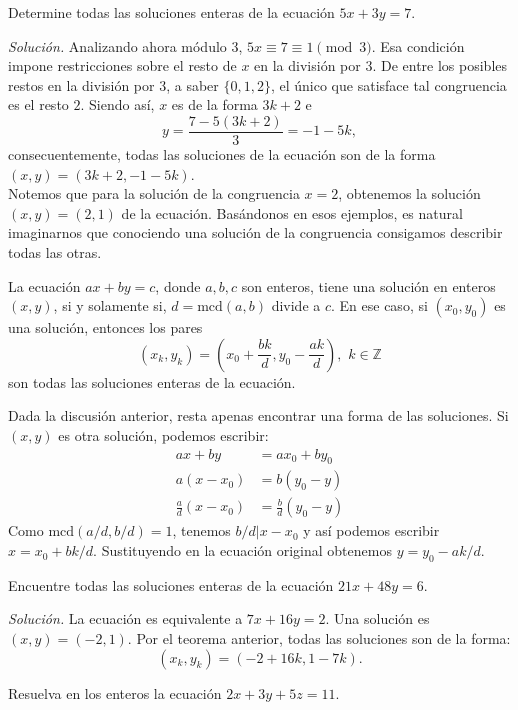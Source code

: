 \documentclass[12pt]{scrartcl}
\begin{document}
\begin{example}
Determine todas las soluciones enteras de la ecuación $5x+3y=7$.
\end{example}

\textit{Solución.} Analizando ahora módulo $3$, $5x\equiv 7\equiv 1\pmod 3$. Esa condición impone restricciones sobre el resto de $x$ en la división por $3$. De entre los posibles restos en la división por $3$, a saber $\{0,1,2\}$, el único que satisface tal congruencia es el resto $2$. Siendo así, $x$ es de la forma $3k+2$ e $$y=\frac{7-5(3k+2)}{3}=-1-5k,$$ consecuentemente, todas las soluciones de la ecuación son de la forma $(x,y)=(3k+2,-1-5k)$.\\

Notemos que para la solución de la congruencia $x=2$, obtenemos la solución $(x,y)=(2,1)$ de la ecuación. Basándonos en esos ejemplos, es natural imaginarnos que conociendo una solución de la congruencia consigamos describir todas las otras.

\begin{theorem}
La ecuación $ax+by=c$, donde $a,b,c$ son enteros, tiene una solución en enteros $(x,y)$, si y solamente si, $d=\mbox{mcd}(a,b)$ divide a $c$. En ese caso, si $(x_0,y_0)$ es una solución, entonces los pares $$(x_k,y_k)=\left( x_0+\frac{bk}{d}, y_0-\frac{ak}{d}\right),\,\, k\in \mathbb{Z}$$ son todas las soluciones enteras de la ecuación.
\end{theorem}

Dada la discusión anterior, resta apenas encontrar una forma de las soluciones. Si $(x,y)$ es otra solución, podemos escribir:\begin{align*}
ax+by & = ax_0+by_0\\
a(x-x_0) & = b(y_0-y)\\
\frac{a}{d}(x-x_0) &=\frac{b}{d}(y_0-y)
\end{align*}
Como $\mbox{mcd}(a/d,b/d)=1$, tenemos $b/d|x-x_0$ y así podemos escribir $x=x_0+bk/d$. Sustituyendo en la ecuación original obtenemos $y=y_0-ak/d$.

\begin{example}
Encuentre todas las soluciones enteras de la ecuación $21x+48y=6$.
\end{example}

\textit{Solución.} La ecuación es equivalente a $7x+16y=2$. Una solución es $(x,y)=(-2,1)$. Por el teorema anterior, todas las soluciones son de la forma:$$(x_k,y_k)=(-2+16k,1-7k).$$

\begin{example}
Resuelva en los enteros la ecuación $2x+3y+5z=11$.
\end{example}
\end{document}
